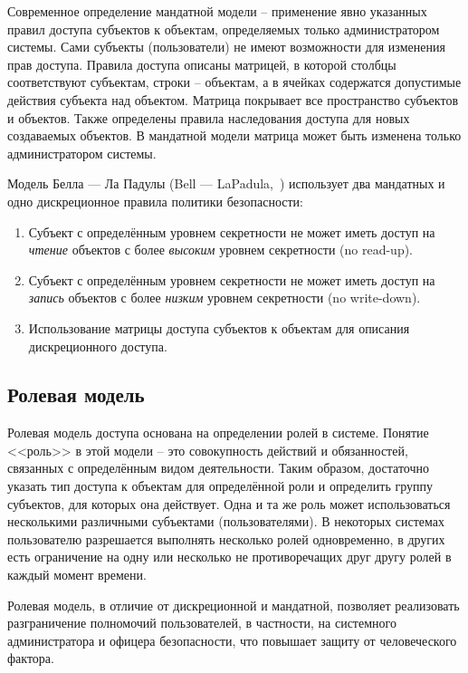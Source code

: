 Современное определение мандатной модели -- применение явно указанных правил доступа субъектов к объектам, определяемых только администратором системы. Сами субъекты (пользователи) не имеют возможности для изменения прав доступа. Правила доступа описаны матрицей, в которой столбцы соответствуют субъектам, строки -- объектам, а в ячейках содержатся допустимые действия субъекта над объектом. Матрица покрывает все пространство субъектов и объектов. Также определены правила наследования доступа для новых создаваемых объектов. В мандатной модели матрица может быть изменена только администратором системы.

Модель Белла --- Ла Падулы (Bell --- LaPadula,~\cite{Bell:LaPadula:1973, Bell:LaPadula:1976}) использует два мандатных и одно дискреционное правила политики безопасности:
\begin{enumerate}
    \item Субъект с определённым уровнем секретности не может иметь доступ на \emph{чтение} объектов с более \emph{высоким} уровнем секретности (no read-up).
    \item Субъект с определённым уровнем секретности не может иметь доступ на \emph{запись} объектов с более \emph{низким} уровнем секретности (no write-down).
    \item Использование матрицы доступа субъектов к объектам для описания дискреционного доступа.
\end{enumerate}

\subsection{Ролевая модель}

Ролевая модель доступа основана на определении ролей в системе. Понятие <<роль>> в этой модели -- это совокупность действий и обязанностей, связанных с определённым видом деятельности. Таким образом, достаточно указать тип доступа к объектам для определённой роли и определить группу субъектов, для которых она действует.
Одна и та же роль может использоваться несколькими различными субъектами (пользователями). В некоторых системах пользователю разрешается выполнять несколько ролей одновременно, в других есть ограничение на одну или несколько не противоречащих друг другу ролей в каждый момент времени.

Ролевая модель, в отличие от дискреционной и мандатной, позволяет реализовать разграничение полномочий пользователей, в частности, на системного администратора и офицера безопасности, что повышает защиту от человеческого фактора.
